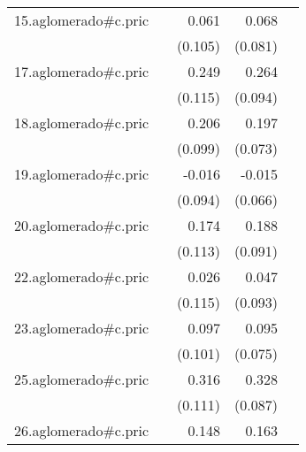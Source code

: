 {\begin{longtable}{l*{4}{D{.}{.}{-1}}}
\addlinespace
15.aglomerado#c.pric&                     &       0.061         &       0.068         &                     \\
            &                     &     (0.105)         &     (0.081)         &                     \\
\addlinespace
17.aglomerado#c.pric&                     &       0.249\sym{*}  &       0.264\sym{**} &                     \\
            &                     &     (0.115)         &     (0.094)         &                     \\
\addlinespace
18.aglomerado#c.pric&                     &       0.206\sym{*}  &       0.197\sym{**} &                     \\
            &                     &     (0.099)         &     (0.073)         &                     \\
\addlinespace
19.aglomerado#c.pric&                     &      -0.016         &      -0.015         &                     \\
            &                     &     (0.094)         &     (0.066)         &                     \\
\addlinespace
20.aglomerado#c.pric&                     &       0.174         &       0.188\sym{*}  &                     \\
            &                     &     (0.113)         &     (0.091)         &                     \\
\addlinespace
22.aglomerado#c.pric&                     &       0.026         &       0.047         &                     \\
            &                     &     (0.115)         &     (0.093)         &                     \\
\addlinespace
23.aglomerado#c.pric&                     &       0.097         &       0.095         &                     \\
            &                     &     (0.101)         &     (0.075)         &                     \\
\addlinespace
25.aglomerado#c.pric&                     &       0.316\sym{**} &       0.328\sym{***}&                     \\
            &                     &     (0.111)         &     (0.087)         &                     \\
\addlinespace
26.aglomerado#c.pric&                     &       0.148         &       0.163\sym{*}  &                     \\

\end{longtable}}
